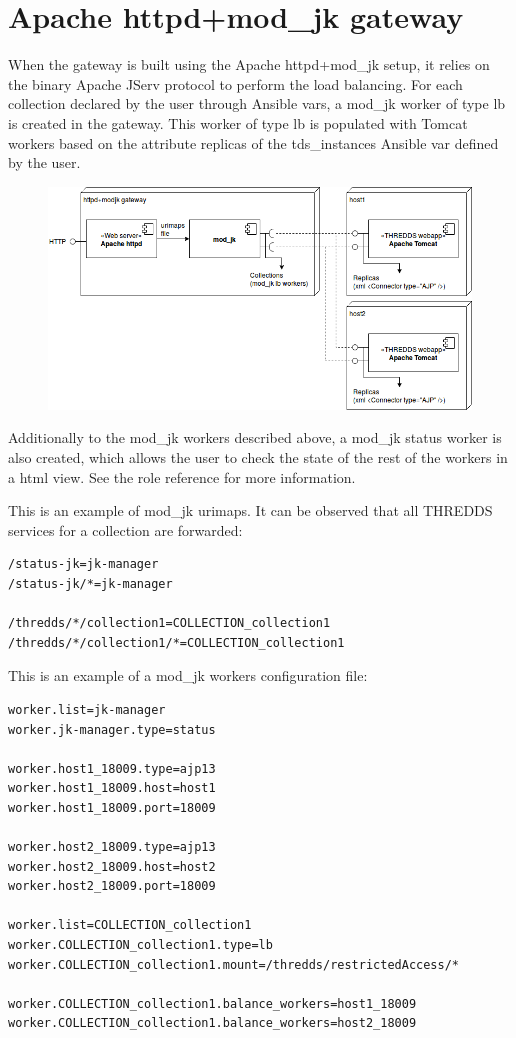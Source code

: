 \documentclass[a4paper,12pt]{article}
\begin{document}
\section{Apache httpd+mod\_jk gateway}

When the gateway is built using the Apache httpd+mod\_jk setup, it relies on the binary Apache JServ protocol to perform the load balancing. For each collection declared by the user through Ansible vars, a mod\_jk worker of type lb is created in the gateway. This worker of type lb is populated with Tomcat workers based on the attribute replicas of the tds\_instances Ansible var defined by the user.

\begin{figure}[h]
\includegraphics[width=1\textwidth]{images/jk-gateway.png}
\end{figure}

Additionally to the mod\_jk workers described above, a mod\_jk status worker is also created, which allows the user to check the state of the rest of the workers in a html view. See the role reference for more information.

This is an example of mod\_jk urimaps. It can be observed that all THREDDS services for a collection are forwarded:

\begin{lstlisting}
/status-jk=jk-manager
/status-jk/*=jk-manager

/thredds/*/collection1=COLLECTION_collection1
/thredds/*/collection1/*=COLLECTION_collection1
\end{lstlisting}

This is an example of a mod\_jk workers configuration file:

\begin{lstlisting}
worker.list=jk-manager
worker.jk-manager.type=status

worker.host1_18009.type=ajp13
worker.host1_18009.host=host1
worker.host1_18009.port=18009

worker.host2_18009.type=ajp13
worker.host2_18009.host=host2
worker.host2_18009.port=18009

worker.list=COLLECTION_collection1
worker.COLLECTION_collection1.type=lb
worker.COLLECTION_collection1.mount=/thredds/restrictedAccess/*

worker.COLLECTION_collection1.balance_workers=host1_18009
worker.COLLECTION_collection1.balance_workers=host2_18009
\end{lstlisting}
\end{document}
